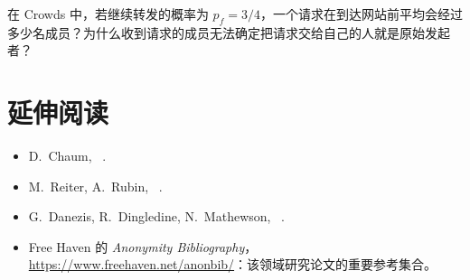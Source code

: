 \begin{esercizio}[2]\label{es:02-crowds}
在 Crowds 中，若继续转发的概率为 $p_f = 3/4$，一个请求在到达网站前平均会经过多少名成员？为什么收到请求的成员无法确定把请求交给自己的人就是原始发起者？
\end{esercizio}

\section*{延伸阅读}
\begin{itemize}
  \item D.~Chaum, ~\cite{chaum1981untraceable}.
  \item M.~Reiter, A.~Rubin, ~\cite{reiter1998crowds}.
  \item G.~Danezis, R.~Dingledine, N.~Mathewson, ~\cite{danezis2003mixminion}.
  \item Free Haven 的 \emph{Anonymity Bibliography}，\url{https://www.freehaven.net/anonbib/}：该领域研究论文的重要参考集合。
\end{itemize}
